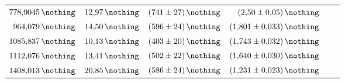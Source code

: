 \begin{table}[h!]
\begin{tabular}{ r  r  r  r  r  r  }
                $\SI{778.9045}{\nothing}$        & $\SI{12.97}{\nothing}$& $\SI{ 741 (27)}{\nothing}$ & $\SI{ 2.50  (5)}{\nothing}$            \\ %
                $\SI{ 964.079}{\nothing}$        & $\SI{14.50}{\nothing}$& $\SI{ 596 (24)}{\nothing}$ & $\SI{1.801 (33)}{\nothing}$            \\ %
                $\SI{1085.837}{\nothing}$        & $\SI{10.13}{\nothing}$& $\SI{ 403 (20)}{\nothing}$ & $\SI{1.743 (32)}{\nothing}$            \\ %
                $\SI{1112.076}{\nothing}$        & $\SI{13.41}{\nothing}$& $\SI{ 502 (22)}{\nothing}$ & $\SI{1.640 (30)}{\nothing}$            \\ %
                $\SI{1408.013}{\nothing}$        & $\SI{20.85}{\nothing}$& $\SI{ 586 (24)}{\nothing}$ & $\SI{1.231 (23)}{\nothing}$            \\ %
    \toprule
  \end{tabular}
\end{table}
